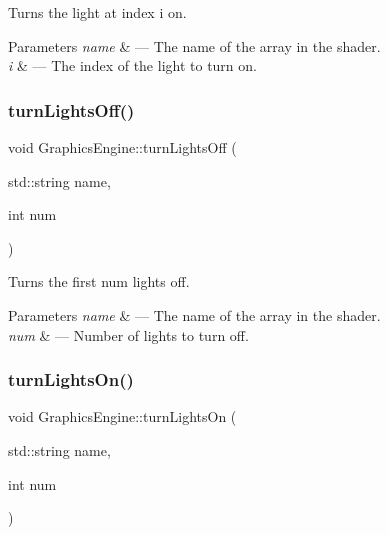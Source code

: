 Turns the light at index i on. 


\begin{DoxyParams}{Parameters}
{\em name} & --- The name of the array in the shader.\\
\hline
{\em i} & --- The index of the light to turn on. \\
\hline
\end{DoxyParams}
\mbox{\label{class_graphics_engine_adc787f919c16eda96ec6709f669ee718}} 
\subsubsection{\texorpdfstring{turn\+Lights\+Off()}{turnLightsOff()}}
{\footnotesize\ttfamily void Graphics\+Engine\+::turn\+Lights\+Off (\begin{DoxyParamCaption}\item[{std\+::string}]{name,  }\item[{int}]{num }\end{DoxyParamCaption})}



Turns the first num lights off. 


\begin{DoxyParams}{Parameters}
{\em name} & --- The name of the array in the shader.\\
\hline
{\em num} & --- Number of lights to turn off. \\
\hline
\end{DoxyParams}
\mbox{\label{class_graphics_engine_aa518c204407c9d1b380d200ef79952f1}} 
\subsubsection{\texorpdfstring{turn\+Lights\+On()}{turnLightsOn()}}
{\footnotesize\ttfamily void Graphics\+Engine\+::turn\+Lights\+On (\begin{DoxyParamCaption}\item[{std\+::string}]{name,  }\item[{int}]{num }\end{DoxyParamCaption})}



